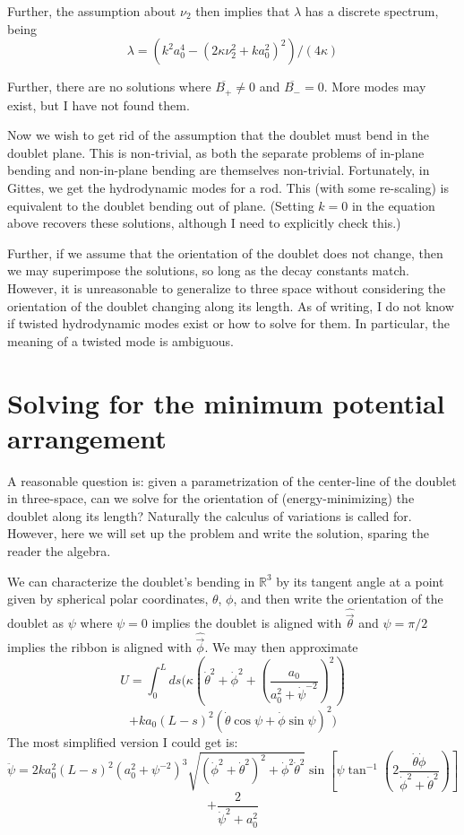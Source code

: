 \documentclass{article}
\theoremstyle{exampstyle} \newtheorem*{remark}{Remark}
\newcommand{\1}{\mathds{1}}
\begin{document}
Further, the assumption about $\nu_2$ then implies that $\lambda$ has a discrete spectrum, being
$$ \lambda= (k^2a_0^4-(2\kappa\nu_2^2+ka_0^2)^2 )/(4\kappa) $$

Further, there are no solutions where $ \overline{B_+}\neq0$ and $\overline{B_-}=0$. More modes may exist, but I have not found them.

Now we wish to get rid of the assumption that the doublet must bend in the doublet plane. This is non-trivial, as both the separate problems of in-plane bending and non-in-plane bending are themselves non-trivial. Fortunately, in Gittes, we get the hydrodynamic modes for a rod. This (with some re-scaling) is equivalent to the doublet bending out of plane. (Setting $k=0$ in the equation above recovers these solutions, although I need to explicitly check this.)

Further, if we assume that the orientation of the doublet does not change, then we may superimpose the solutions, so long as the decay constants match. However, it is unreasonable to generalize to three space without considering the orientation of the doublet changing along its length. As of writing, I do not know if twisted hydrodynamic modes exist or how to solve for them. In particular, the meaning of a twisted mode is ambiguous. 


\section{Solving for the minimum potential arrangement}

A reasonable question is: given a parametrization of the center-line of the doublet in three-space, can we solve for the orientation of (energy-minimizing) the doublet along its length? Naturally the calculus of variations is called for. However, here we will set up the problem and write the solution, sparing the reader the algebra.

We can characterize the doublet's bending in $\mathbb{R}^3$ by its tangent angle at a point given by spherical polar coordinates, $\theta$, $\phi$, and then write the orientation of the doublet as $\psi$ where $\psi=0$ implies the doublet is aligned with $\hat{\vec{\theta}}$ and $\psi=\pi/2$ implies the ribbon is aligned with $\hat{\vec{\phi}}$. We may then approximate 
$$ U=\int_0^L ds ( \kappa \left( \dot{\theta}^2+\dot{\phi}^2+\left( \frac{a_0}{a_0^2+\dot{\psi}^{-2} } \right)^2\right) $$
$$+ ka_0(L-s)^2 \left(\dot{\theta}\cos \psi +\dot{\phi} \sin \psi \right)^2) $$
The most simplified version I could get is:
\[ \ddot{\psi}=2ka_0^2(L-s)^2\left(a_0^2+\psi^{-2}\right)^3\sqrt{\left(\dot{\phi}^2+\dot{\theta}^2\right)^2+\dot{\phi}^2\dot{\theta}^2 } 
\sin \left[ \psi \tan^{-1} \left( 2\frac {\dot{\theta}\dot{\phi}}{\dot{\phi}^2+\dot{\theta}^2} \right) \right] \]
$$+\frac{2}{\dot{\psi}^2+a_0^2}$$
\end{document}
